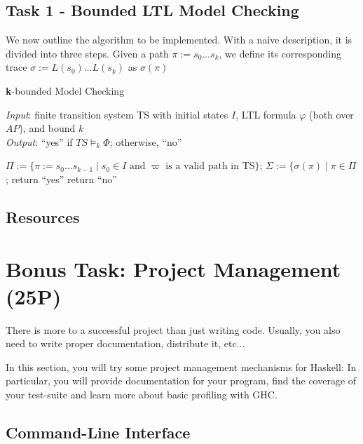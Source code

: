 \documentclass{article}
\begin{document}
\subsection*{Task 1 - Bounded LTL Model Checking}
We now outline the algorithm to be implemented. With a naive description, it is divided into three steps. Given a path $\pi := s_0 \dots s_k$, we define its corresponding trace $\sigma := L(s_0) \dots L(s_k)$ as $\sigma(\pi)$
\begin{algorithm}[H]
    \caption{\textbf{k}-bounded  Model Checking}
    \hspace*{\algorithmicindent} \emph{Input}: finite transition system TS with initial states $I$, LTL formula $\varphi$ (both over $AP$), and bound $k$ \\
    \hspace*{\algorithmicindent} \emph{Output}: ``yes'' if $TS \vDash_k \Phi$; otherwise, ``no''
    \begin{algorithmic}
    \State $\Pi := \{ \pi := s_0 \dots s_{k-1} \mid s_0 \in I \text{ and } \varpi \text{ is a valid path in TS} \}  $;
    \State $\Sigma := \{ \sigma(\pi) \mid  \pi \in \Pi$;
        \State return ``yes''
    \Else 
        \State return ``no''
    \end{algorithmic}
\end{algorithm}

\subsection*{Resources}
\cite[Paragraph 5.1 (in particular 5.1.1 and 5.1.2)]{BaKa}

\section{Bonus Task: Project Management (25P)}

There is more to a successful project than just writing code. 
Usually, you also need to write proper documentation, distribute it, etc...

In this section, you will try some project management mechanisms for Haskell: 
In particular, you will provide documentation for your program, 
find the coverage of your test-suite and learn more about basic profiling with GHC.

\subsection{Command-Line Interface}
\end{document}
